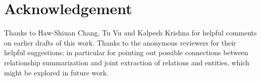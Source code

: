 \documentclass[11pt,a4paper]{article}
\begin{document}
\section{Acknowledgement}
Thanks to Haw-Shiuan Chang, Tu Vu and Kalpesh Krishna for helpful comments on earlier drafts of this work. Thanks to the anonymous reviewers for their helpful suggestions; in particular for pointing out possible  connections between relationship summarization and joint extraction of relations and entities, which might be explored in future work.




\end{document}
